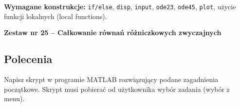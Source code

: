 \documentclass[a4paper,11pt]{article}
\begin{document}
\vspace{0.3cm}
\begin{ramka}
\textbf{Wymagane konstrukcje:}
\texttt{if/else}, \texttt{disp}, \texttt{input}, \texttt{ode23}, \texttt{ode45}, \texttt{plot}, użycie funkcji lokalnych (local functions).
\end{ramka}

\clearpage
\begin{center}
  {\large\bfseries Zestaw nr 25 \quad -- \quad Całkowanie równań różniczkowych zwyczajnych}
\end{center}
\hrulefill
\vspace{0.4cm}

\subsection*{Polecenia}

Napisz skrypt w programie MATLAB rozwiązujący podane zagadnienia początkowe. Skrypt musi pobierać od użytkownika wybór zadania (wybór z menu).
\end{document}

